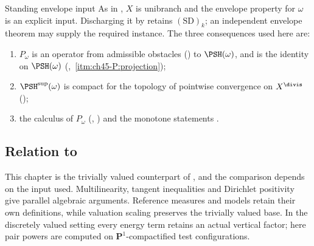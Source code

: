 \begin{important}{Standing envelope input}
\label{imp:ch47-envelope}
As in , $X$ is unibranch and the
envelope property for $\omega$ is an explicit input. Discharging it by
 retains $\mathrm{(SD)}_k$; an independent
envelope theorem may supply the required instance. The three consequences used
here are:
\begin{enumerate}
\item\label{itm:ch47-env:operator}
      $P_\omega$ is an operator from admissible obstacles
      () to $\PSH(\omega)$, and is the
      identity on $\PSH(\omega)$
      (,
      \,\cref{itm:ch45-P:projection});
\item\label{itm:ch47-env:compact}
      $\PSH^{\sup}(\omega)$ is compact for the topology of pointwise
      convergence on $X^{\divis}$ ();
\item\label{itm:ch47-env:calculus}
      the calculus of $P_\omega$
      (,
      ) and the monotone statements
      .
\end{enumerate}
\end{important}

\subsection{Relation to \texorpdfstring{}{Part III}}
\label{sec:ch47-part3}

This chapter is the trivially valued counterpart of
,
and the comparison depends on the input used. Multilinearity, tangent
inequalities and Dirichlet positivity give parallel algebraic arguments.
Reference measures and models retain their own definitions, while
valuation scaling preserves the trivially valued base. In the
discretely valued setting every energy term retains an actual vertical
factor; here pair powers are computed on $\mathbf P^1$-compactified
test configurations.


